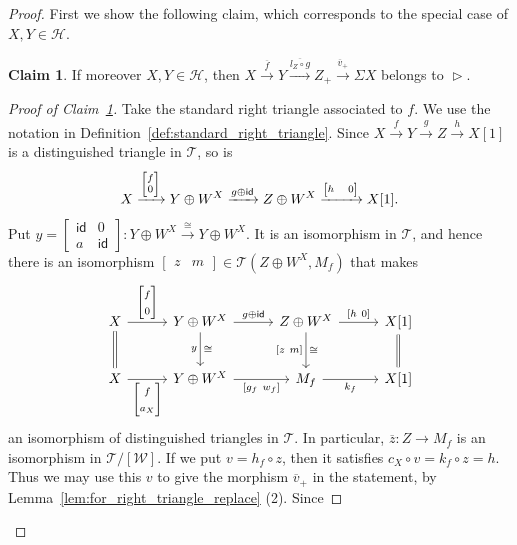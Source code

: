\documentclass[a4paper,reqno,10pt]{amsart}
\theoremstyle{definition}
\theoremstyle{definition}
\theoremstyle{definition}
\theoremstyle{definition}
\newtheorem{claim}[claim]{Claim}
\theoremstyle{plain}
\newcommand{\id}{\mathsf{id}}
\newcommand{\CH}{\mathcal{H}}
\newcommand{\CT}{\mathcal{T}}
\newcommand{\CW}{\mathcal{W}}
\begin{document}
\begin{proof}
First we show the following claim, which corresponds to the special case of $X,Y\in\CH$.
\begin{claim}\label{claim:if_XYinH}
If moreover $X,Y\in\CH$, then 
$X\xrightarrow{\overline{f}}Y\xrightarrow{\overline{l_Z\circ g}}Z_+\xrightarrow{\overline{v}_+}\Sigma X$
belongs to $\vartriangleright$.
\end{claim}
\begin{proof}[Proof of Claim~\ref{claim:if_XYinH}]
Take the standard right triangle associated to $f$. We use the notation in Definition~\ref{def:standard_right_triangle}.
Since $X\xrightarrow{f}Y\xrightarrow{g}Z\xrightarrow{h}X[1]$ is a distinguished triangle in $\CT$, so is
\[
X\xrightarrow{{\scriptsize\begin{bmatrix}f\\ 0\end{bmatrix}}}Y\oplus W^X\xrightarrow{g\oplus \id}Z\oplus W^X\xrightarrow{{\scriptsize\begin{bmatrix}h&0\end{bmatrix}}}X[1].
\]
Put $y=\begin{bmatrix}\id&0\\ a&\id\end{bmatrix}\colon Y\oplus W^X\xrightarrow{\cong}Y\oplus W^X$. It is an isomorphism in $\CT$, and hence there is an isomorphism $\begin{bmatrix}z&m\end{bmatrix}\in\CT(Z\oplus W^X,M_f)$ that makes
\[
\begin{tikzcd}[row sep=0.8cm, column sep=1.0cm]
X \arrow{r}{\begin{bmatrix}f\\ 0\end{bmatrix}}\arrow[d, equal]
&Y\oplus W^X \arrow{d}{\cong}[swap]{y} \arrow{r}{g\oplus\id}
&Z\oplus W^X\arrow{r}{[h\ 0]} \arrow{d}{\cong}[swap]{{[}z\ m{]}}
&X{[}1{]} \arrow[d, equal]
\\
X\arrow{r}[swap]{\begin{bmatrix}f\\ a_X\end{bmatrix}}
&Y\oplus W^X\arrow{r}[swap]{[g_f\ w_f]}
&M_f \arrow{r}[swap]{k_f}
&X{[}1{]}
\end{tikzcd}
\]
an isomorphism of distinguished triangles in $\CT$.
In particular, $\overline{z}\colon Z\to M_f$ is an isomorphism in $\CT/[\CW]$. If we put $v=h_f\circ z$, then it satisfies $c_X\circ v=k_f\circ z=h$. Thus we may use this $v$ to give the morphism $\overline{v}_+$ in the statement, by Lemma~\ref{lem:for_right_triangle_replace} {\rm (2)}. Since

\end{proof}
\end{proof}
\end{document}
